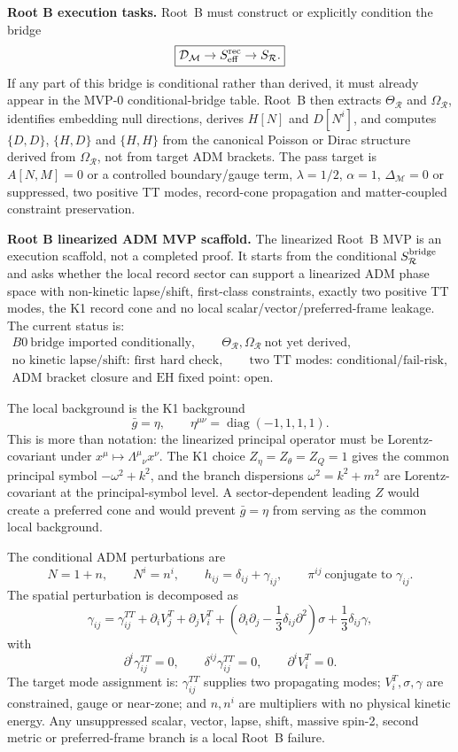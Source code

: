 \documentclass[11pt]{article}
\begin{document}
\medskip\noindent\textbf{Root B execution tasks.}
Root~B must construct or explicitly condition the bridge
\[
\boxed{
\mathcal D_{\mathcal M}\to S_{\rm eff}^{\rm rec}\to S_{\mathcal R}.
}
\]
If any part of this bridge is conditional rather than derived, it must already
appear in the MVP-0 conditional-bridge table.  Root~B then extracts
\(\Theta_{\mathcal R}\) and \(\Omega_{\mathcal R}\), identifies embedding null
directions, derives \(H[N]\) and \(D[N^i]\), and computes
\(\{D,D\}\), \(\{H,D\}\) and \(\{H,H\}\) from the canonical Poisson or Dirac
structure derived from \(\Omega_{\mathcal R}\), not from target ADM brackets.
The pass target is \(A[N,M]=0\) or a controlled boundary/gauge term,
\(\lambda=1/2\), \(\alpha=1\), \(\Delta_{\mathcal M}=0\) or suppressed, two
positive TT modes, record-cone propagation and matter-coupled constraint
preservation.

\medskip\noindent\textbf{Root B linearized ADM MVP scaffold.}
The linearized Root~B MVP is an execution scaffold, not a completed proof.  It
starts from the conditional \(S_{\mathcal R}^{\rm bridge}\) and asks whether
the local record sector can support a linearized ADM phase space with
non-kinetic lapse/shift, first-class constraints, exactly two positive TT
modes, the K1 record cone and no local scalar/vector/preferred-frame leakage.
The current status is:
\[
\boxed{
\begin{gathered}
B0\ \text{bridge imported conditionally},\qquad
\Theta_{\mathcal R},\Omega_{\mathcal R}\ \text{not yet derived},\\
\text{no kinetic lapse/shift: first hard check},\qquad
\text{two TT modes: conditional/fail-risk},\\
\text{ADM bracket closure and EH fixed point: open.}
\end{gathered}
}
\]

The local background is the K1 background
\[
\boxed{\bar g=\eta,\qquad \eta^{\mu\nu}=\operatorname{diag}(-1,1,1,1).}
\]
This is more than notation: the linearized principal operator must be
Lorentz-covariant under \(x^\mu\mapsto\Lambda^\mu{}_\nu x^\nu\).  The K1
choice \(Z_\eta=Z_\theta=Z_Q=1\) gives the common principal symbol
\(-\omega^2+k^2\), and the branch dispersions
\(\omega^2=k^2+m^2\) are Lorentz-covariant at the principal-symbol level.  A
sector-dependent leading \(Z\) would create a preferred cone and would prevent
\(\bar g=\eta\) from serving as the common local background.

The conditional ADM perturbations are
\[
\boxed{
N=1+n,\qquad N^i=n^i,\qquad h_{ij}=\delta_{ij}+\gamma_{ij},\qquad
\pi^{ij}\ \text{conjugate to }\gamma_{ij}.
}
\]
The spatial perturbation is decomposed as
\[
\boxed{
\gamma_{ij}
=\gamma_{ij}^{TT}
+\partial_iV_j^T+\partial_jV_i^T
+\left(\partial_i\partial_j-\frac13\delta_{ij}\partial^2\right)\sigma
+\frac13\delta_{ij}\gamma,
}
\]
with
\[
\boxed{
\partial^i\gamma_{ij}^{TT}=0,\qquad
\delta^{ij}\gamma_{ij}^{TT}=0,\qquad
\partial^iV_i^T=0.
}
\]
The target mode assignment is: \(\gamma_{ij}^{TT}\) supplies two propagating
modes; \(V_i^T,\sigma,\gamma\) are constrained, gauge or near-zone; and
\(n,n^i\) are multipliers with no physical kinetic energy.  Any
unsuppressed scalar, vector, lapse, shift, massive spin-2, second metric or
preferred-frame branch is a local Root~B failure.
\end{document}
